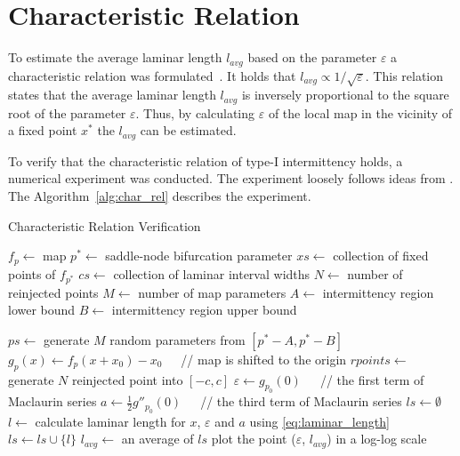 \section{Characteristic Relation}

To estimate the average laminar length $l_{avg}$ based on the parameter $\varepsilon$ a characteristic relation was formulated~\cite{Elaskar2017}.
It holds that $l_{avg} \propto 1/\sqrt{\varepsilon}$.
This relation states that the average laminar length $l_{avg}$ is inversely proportional to the square root of the parameter $\varepsilon$.
Thus, by calculating $\varepsilon$ of the local map in the vicinity of a fixed point $x^{*}$ the $l_{avg}$ can be estimated.
\par
To verify that the characteristic relation of type-I intermittency holds, a numerical experiment was conducted.
The experiment loosely follows ideas from \cite{Elaskar2022}.
The Algorithm~\ref{alg:char_rel} describes the experiment.

\begin{algorithm}[!h]
    \caption{Characteristic Relation Verification}
    \label{alg:char_rel}
    \begin{algorithmic}[1]
        \Statex $f_{p} \gets$ map
        \Statex $p^{*} \gets$ saddle-node bifurcation parameter
        \Statex $xs \gets$ collection of fixed points of $f_{p^{*}}$
        \Statex $cs \gets$ collection of laminar interval widths
        \Statex $N \gets$ number of reinjected points
        \Statex $M \gets$ number of map parameters
        \Statex $A \gets$ intermittency region lower bound
        \Statex $B \gets$ intermittency region upper bound

        \State $ps \gets$ generate $M$ random parameters from $[p^{*}-A, p^{*}-B]$
            \State $g_{p}(x) \gets f_{p}(x + x_0) - x_0$   $\;\;\;$ // map is shifted to the origin
                    \State $rpoints \gets$ generate $N$ reinjected point into $[-c, c]$
                    \State $\varepsilon \gets g_{p_{0}}(0)$  $\;\;\;$   // the first term of Maclaurin series
                    \State $a \gets \frac{1}{2}g''_{p_{0}}(0)$  $\;\;\;$  // the third term of Maclaurin series
                    \State $ls \gets \emptyset$
                        \State $l \gets$ calculate laminar length for $x$, $\varepsilon$ and $a$ using \eqref{eq:laminar_length}
                        \State $ls \gets ls \cup \{l\}$
                    \EndFor
                    \State $l_{avg} \gets$ an average of $ls$
                    \State plot the point ($\varepsilon$, $l_{avg}$) in a log-log scale
                \EndFor
            \EndFor
        \EndFor
    \end{algorithmic}
\end{algorithm}


